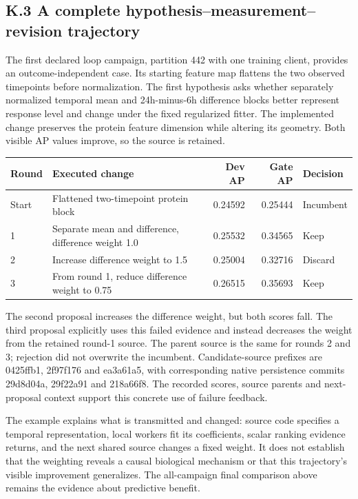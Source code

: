 \subsection*{K.3 A complete hypothesis--measurement--revision trajectory}
The first declared loop campaign, partition 442 with one training client, provides an outcome-independent case. Its starting feature map flattens the two observed timepoints before normalization. The first hypothesis asks whether separately normalized temporal mean and 24h-minus-6h difference blocks better represent response level and change under the fixed regularized fitter. The implemented change preserves the protein feature dimension while altering its geometry. Both visible AP values improve, so the source is retained.

\begin{center}
\small
\begin{tabularx}{\linewidth}{lXrrl}
\toprule
Round & Executed change & Dev AP & Gate AP & Decision \\
\midrule
Start & Flattened two-timepoint protein block & 0.24592 & 0.25444 & Incumbent \\
1 & Separate mean and difference, difference weight 1.0 & 0.25532 & 0.34565 & Keep \\
2 & Increase difference weight to 1.5 & 0.25004 & 0.32716 & Discard \\
3 & From round 1, reduce difference weight to 0.75 & 0.26515 & 0.35693 & Keep \\
\bottomrule
\end{tabularx}
\end{center}

The second proposal increases the difference weight, but both scores fall. The third proposal explicitly uses this failed evidence and instead decreases the weight from the retained round-1 source. The parent source is the same for rounds 2 and 3; rejection did not overwrite the incumbent. Candidate-source prefixes are 0425ffb1, 2f97f176 and ea3a61a5, with corresponding native persistence commits 29d8d04a, 29f22a91 and 218a66f8. The recorded scores, source parents and next-proposal context support this concrete use of failure feedback.

The example explains what is transmitted and changed: source code specifies a temporal representation, local workers fit its coefficients, scalar ranking evidence returns, and the next shared source changes a fixed weight. It does not establish that the weighting reveals a causal biological mechanism or that this trajectory's visible improvement generalizes. The all-campaign final comparison above remains the evidence about predictive benefit.
